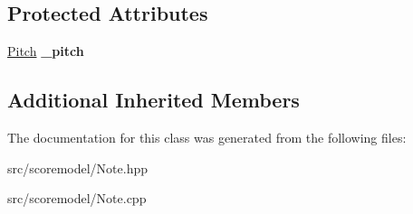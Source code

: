 \subsection*{Protected Attributes}
\begin{DoxyCompactItemize}
\item 
\mbox{\label{classScoreModel_1_1Note_a4ceff3d3b949cd164f8c8da8b4f7c149}} 
\mbox{\hyperlink{classPitch}{Pitch}} {\bfseries \+\_\+pitch}
\end{DoxyCompactItemize}
\subsection*{Additional Inherited Members}


The documentation for this class was generated from the following files\+:\begin{DoxyCompactItemize}
\item 
src/scoremodel/Note.\+hpp\item 
src/scoremodel/Note.\+cpp\end{DoxyCompactItemize}
